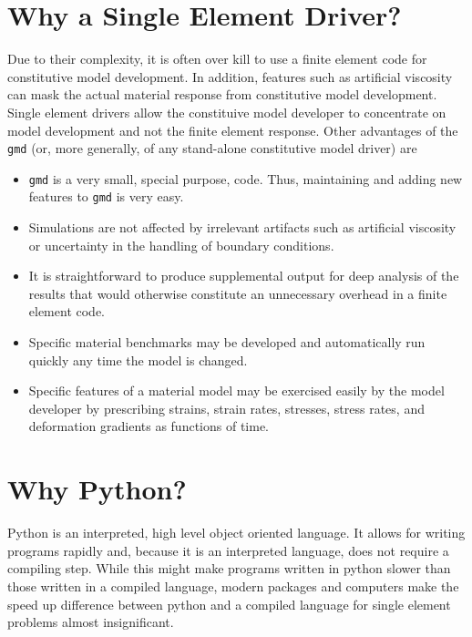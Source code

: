 \documentclass[11pt]{report}
\newcommand{\gmd}{\texttt{gmd}}
\begin{document}
\section{Why a Single Element Driver?}
Due to their complexity, it is often over kill to use a finite element code
for constitutive model development. In addition, features such as artificial
viscosity can mask the actual material response from constitutive model
development. Single element drivers allow the constituive model developer to
concentrate on model development and not the finite element response. Other
advantages of the \gmd{} (or, more generally, of any stand-alone
constitutive model driver) are

\begin{itemize}
  \item \gmd{} is a very small, special purpose, code. Thus, maintaining and
  adding new features to \gmd{} is very easy.

  \item Simulations are not affected by irrelevant artifacts such as
  artificial viscosity or uncertainty in the handling of boundary conditions.

  \item It is straightforward to produce supplemental output for deep analysis
  of the results that would otherwise constitute an unnecessary overhead in a
  finite element code.

  \item Specific material benchmarks may be developed and automatically run
  quickly any time the model is changed.

  \item Specific features of a material model may be exercised easily by the
  model developer by prescribing strains, strain rates, stresses, stress
  rates, and deformation gradients as functions of time.
\end{itemize}

\section{Why Python?}
Python is an interpreted, high level object oriented language. It allows for
writing programs rapidly and, because it is an interpreted language, does not
require a compiling step. While this might make programs written in python
slower than those written in a compiled language, modern packages and
computers make the speed up difference between python and a compiled language
for single element problems almost insignificant.
\end{document}
